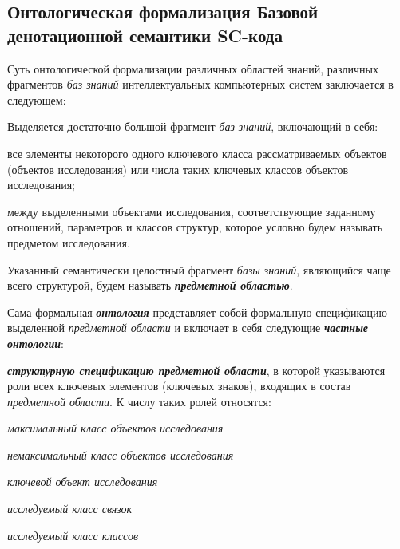 \subsection{Онтологическая формализация Базовой денотационной семантики SC-кода}
\label{sec_ontological_formalization_basic_denotational_semantics_sc-code}

Суть онтологической формализации различных областей знаний, различных фрагментов \textit{баз знаний} интеллектуальных компьютерных систем заключается в следующем:
\begin{textitemize}
	\item Выделяется достаточно большой  фрагмент \textit{баз знаний}, включающий в себя:
	\begin{textitemize}
		\item все элементы некоторого одного ключевого класса рассматриваемых объектов (объектов исследования) или  числа таких ключевых классов объектов исследования;
		\item {} между выделенными объектами исследования, соответствующие заданному  отношений, параметров и классов структур, которое условно будем называть предметом исследования. 
	\end{textitemize}
	\item Указанный семантически целостный фрагмент \textit{базы знаний}, являющийся чаще всего  структурой, будем называть \textbf{\textit{предметной областью}}.
	\item Сама формальная \textbf{\textit{онтология}} представляет собой формальную спецификацию выделенной \textit{предметной области} и включает в себя следующие \textbf{\textit{частные онтологии}}:
	\begin{textitemize}
		\item \textbf{\textit{структурную спецификацию предметной области}}, в которой указываются роли всех ключевых элементов (ключевых знаков), входящих в состав \textit{предметной области}. К числу таких ролей относятся:
		\begin{textitemize}
			\item \textit{максимальный класс объектов исследования\scnrolesign}
			\item \textit{немаксимальный класс объектов исследования\scnrolesign}
			\item \textit{ключевой объект исследования\scnrolesign}
			\item \textit{исследуемый класс связок\scnrolesign}
			\item \textit{исследуемый класс классов\scnrolesign}

\end{textitemize}
\end{textitemize}
\end{textitemize}

